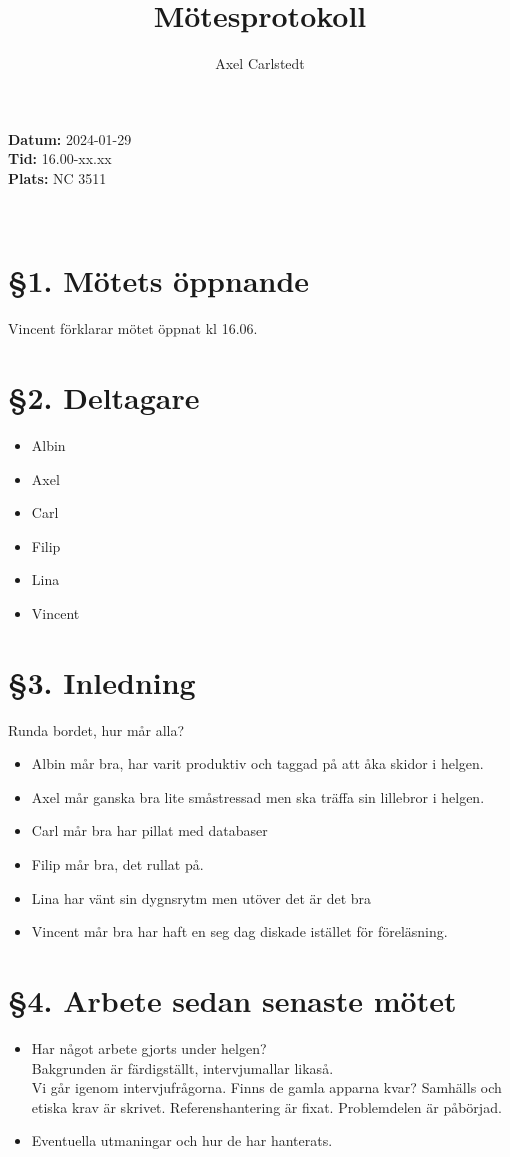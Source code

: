 \documentclass[a4paper, 11pt]{article}
\title{Mötesprotokoll}
\author{Axel Carlstedt}
\begin{document}
\pagestyle{style1}


\textbf{Datum:} 2024-01-29\\
\textbf{Tid:} 16.00-xx.xx\\
\textbf{Plats:} NC 3511

\makebox[\linewidth]{\rule{\linewidth}{0.4pt}}\\

\section*{§1. Mötets öppnande}
Vincent förklarar mötet öppnat kl 16.06.

\section*{§2. Deltagare}
\begin{itemize}
    \item Albin
    \item Axel
    \item Carl
    \item Filip
    \item Lina
    \item Vincent
\end{itemize}


\section*{§3. Inledning}
Runda bordet, hur mår alla?
\begin{itemize}
    \item Albin mår bra, har varit produktiv och taggad på att åka skidor i helgen.
    \item Axel mår ganska bra lite småstressad men ska träffa sin lillebror i helgen.
    \item Carl mår bra har pillat med databaser
    \item Filip mår bra, det rullat på.
    \item Lina har vänt sin dygnsrytm men utöver det är det bra
    \item Vincent mår bra har haft en seg dag diskade istället för föreläsning.
\end{itemize}


\section*{§4. Arbete sedan senaste mötet}
\begin{itemize}
    \item Har något arbete gjorts under helgen?\\
        Bakgrunden är färdigställt, intervjumallar likaså.\\ Vi går igenom intervjufrågorna. Finns de gamla apparna kvar? Samhälls och etiska krav är skrivet. Referenshantering är fixat.
        Problemdelen är påbörjad.
    \item Eventuella utmaningar och hur de har hanterats.\\
\end{itemize}
\end{document}
